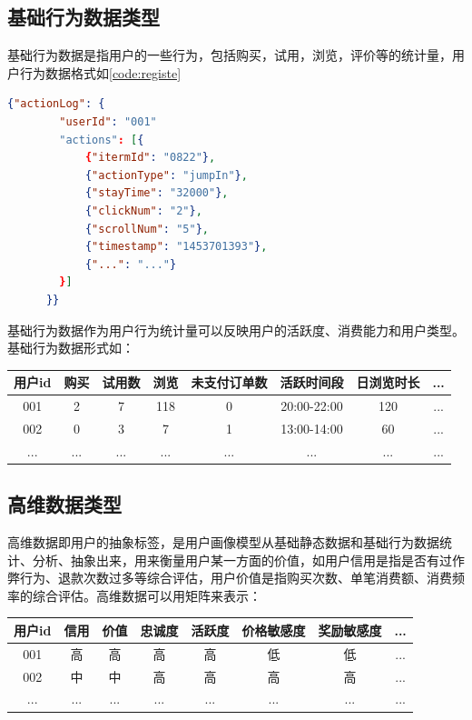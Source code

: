   \subsection{基础行为数据类型}
  基础行为数据是指用户的一些行为，包括购买，试用，浏览，评价等的统计量，用户行为数据格式如\autoref{code:registe}
    \begin{lstlisting}[language=json,firstnumber=1,label={code:registe}]
      {"actionLog": {
        "userId": "001"
        "actions": [{
            {"itermId": "0822"},
            {"actionType": "jumpIn"},
            {"stayTime": "32000"},
            {"clickNum": "2"},
            {"scrollNum": "5"},
            {"timestamp": "1453701393"},
            {"...": "..."}
        }]
      }}
    \end{lstlisting}
  基础行为数据作为用户行为统计量可以反映用户的活跃度、消费能力和用户类型。基础行为数据形式如：
    \begin{table}[htp]
    \centering
    \label{tab:tagweight}
    \begin{tabular}{|c|c|c|c|c|c|c|c|} \hline
     用户id & 购买 & 试用数 & 浏览 & 未支付订单数 & 活跃时间段 & 日浏览时长 & ... \\ \hline
     001 & 2 & 7 & 118 & 0 & 20:00-22:00 & 120 & ... \\ \hline
     002 & 0 & 3 & 7 & 1 & 13:00-14:00 & 60 & ... \\ \hline
     ... & ... & ... & ... & ... & ... & ... & ... \\ \hline
    \end{tabular}
    \end{table}

  \subsection{高维数据类型}
  高维数据即用户的抽象标签，是用户画像模型从基础静态数据和基础行为数据统计、分析、抽象出来，用来衡量用户某一方面的价值，如用户信用是指是否有过作弊行为、退款次数过多等综合评估，用户价值是指购买次数、单笔消费额、消费频率的综合评估。高维数据可以用矩阵来表示：
    \begin{table}[htp]
    \centering
    \label{tab:tagweight}
    \begin{tabular}{|c|c|c|c|c|c|c|c|} \hline
     用户id & 信用 & 价值 & 忠诚度 & 活跃度 & 价格敏感度 & 奖励敏感度 & ... \\ \hline
     001 & 高 & 高 & 高 & 高 & 低 & 低 & ... \\ \hline
     002 & 中 & 中 & 高 & 高 & 高 & 高 & ... \\ \hline
     ... & ... & ... & ... & ... & ... & ... & ... \\ \hline
    \end{tabular}
    \end{table}

